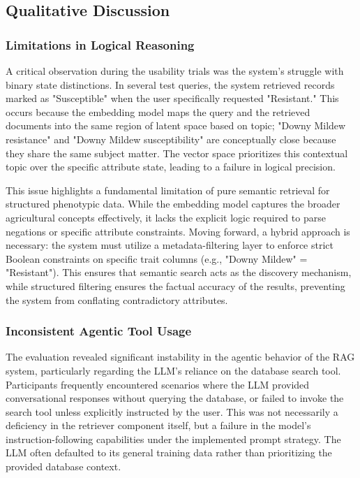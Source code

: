 \documentclass[journal]{./IEEE/IEEEtran}
\begin{document}
\subsection{Qualitative Discussion}
\subsubsection{Limitations in Logical Reasoning}
A critical observation during the usability trials was the system's struggle with binary state distinctions. In several test queries, the system retrieved records marked as "Susceptible" when the user specifically requested "Resistant." This occurs because the embedding model maps the query and the retrieved documents into the same region of latent space based on topic; "Downy Mildew resistance" and "Downy Mildew susceptibility" are conceptually close because they share the same subject matter. The vector space prioritizes this contextual topic over the specific attribute state, leading to a failure in logical precision.

This issue highlights a fundamental limitation of pure semantic retrieval for structured phenotypic data. While the embedding model captures the broader agricultural concepts effectively, it lacks the explicit logic required to parse negations or specific attribute constraints. Moving forward, a hybrid approach is necessary: the system must utilize a metadata-filtering layer to enforce strict Boolean constraints on specific trait columns (e.g., "Downy Mildew" = "Resistant"). This ensures that semantic search acts as the discovery mechanism, while structured filtering ensures the factual accuracy of the results, preventing the system from conflating contradictory attributes.

\subsubsection{Inconsistent Agentic Tool Usage}
The evaluation revealed significant instability in the agentic behavior of the RAG system, particularly regarding the LLM's reliance on the database search tool. Participants frequently encountered scenarios where the LLM provided conversational responses without querying the database, or failed to invoke the search tool unless explicitly instructed by the user. This was not necessarily a deficiency in the retriever component itself, but a failure in the model's instruction-following capabilities under the implemented prompt strategy. The LLM often defaulted to its general training data rather than prioritizing the provided database context.
\end{document}
